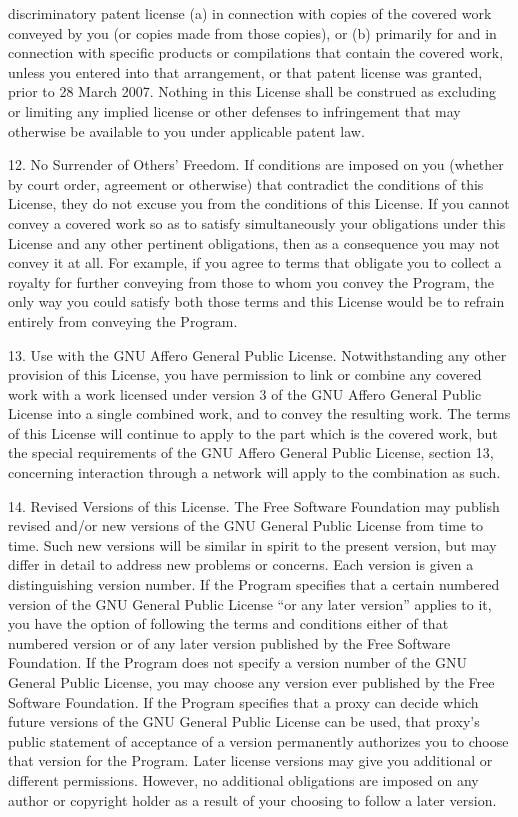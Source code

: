 \documentclass {book}
\begin{document}
\begin{tiny}
discriminatory patent license (a) in connection with copies of the covered work conveyed by you (or copies made from those copies), or (b) primarily for and in connection with specific products or compilations that contain the covered work, unless you entered into that arrangement, or that patent license was granted, prior to 28 March 2007. Nothing in this License shall be construed as excluding or limiting any implied license or other defenses to infringement that may otherwise be available to you under applicable patent law.

12. No Surrender of Others' Freedom. If conditions are imposed on you (whether by court order, agreement or otherwise) that contradict the conditions of this License, they do not excuse you from the conditions of this License. If you cannot convey a covered work so as to satisfy simultaneously your obligations under this License and any other pertinent obligations, then as a consequence you may not convey it at all. For example, if you agree to terms that obligate you to collect a royalty for further conveying from those to whom you convey the Program, the only way you could satisfy both those terms and this License would be to refrain entirely from conveying the Program.

13. Use with the GNU Affero General Public License. Notwithstanding any other provision of this License, you have permission to link or combine any covered work with a work licensed under version 3 of the GNU Affero General Public License into a single combined work, and to convey the resulting work. The terms of this License will continue to apply to the part which is the covered work, but the special requirements of the GNU Affero General Public License, section 13, concerning interaction through a network will apply to the combination as such.

14. Revised Versions of this License. The Free Software Foundation may publish revised and/or new versions of the GNU General Public License from time to time. Such new versions will be similar in spirit to the present version, but may differ in detail to address new problems or concerns. Each version is given a distinguishing version number. If the Program specifies that a certain numbered version of the GNU General Public License ``or any later version'' applies to it, you have the option of following the terms and conditions either of that numbered version or of any later version published by the Free Software Foundation. If the Program does not specify a version number of the GNU General Public License, you may choose any version ever published by the Free Software Foundation. If the Program specifies that a proxy can decide which future versions of the GNU General Public License can be used, that proxy's public statement of acceptance of a version permanently authorizes you to choose that version for the Program. Later license versions may give you additional or different permissions. However, no additional obligations are imposed on any author or copyright holder as a result of your choosing to follow a later version.


\end{tiny}
\end{document}
